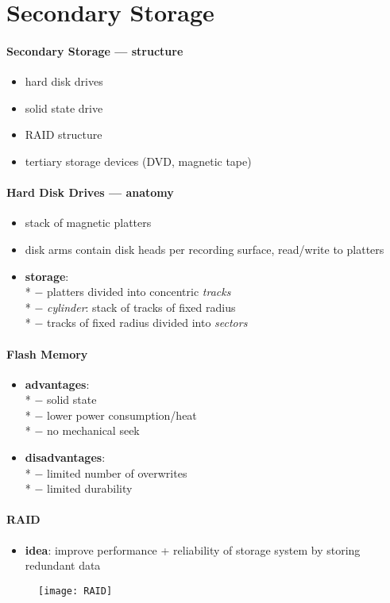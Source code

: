 \section{Secondary Storage}

\paragraph{Secondary Storage --- structure}
\begin{itemize}
  \item hard disk drives
  \item solid state drive
  \item RAID structure
  \item tertiary storage devices (DVD, magnetic tape)
\end{itemize}

\paragraph{Hard Disk Drives --- anatomy}
\begin{itemize}
  \item stack of magnetic platters
  \item disk arms contain disk heads per recording surface, read/write to platters
  \item \textbf{storage}: \\*
    $ - $ platters divided into concentric \emph{tracks} \\*
    $ - $ \emph{cylinder}: stack of tracks of fixed radius \\*
    $ - $ tracks of fixed radius divided into \emph{sectors}
\end{itemize}

\paragraph{Flash Memory}
\begin{itemize}
  \item \textbf{advantages}: \\*
    $ - $ solid state \\*
    $ - $ lower power consumption/heat \\*
    $ - $ no mechanical seek
  \item \textbf{disadvantages}: \\*
    $ - $ limited number of overwrites \\*
    $ - $ limited durability
\end{itemize}

\paragraph{RAID}
\begin{itemize}
  \item \textbf{idea}: improve performance + reliability of storage system by storing redundant data
\end{itemize}
\begin{figure}[h]\centering\label{RAID}\texttt{[image: RAID]}\end{figure}